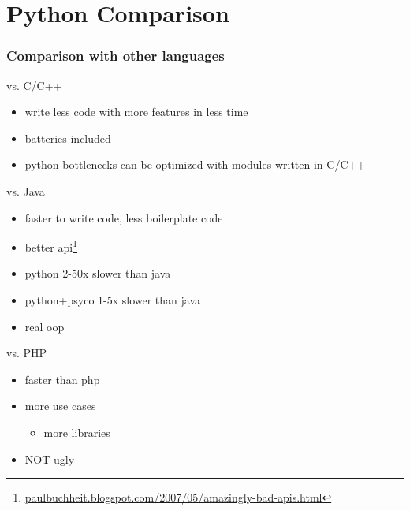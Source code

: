 \documentclass{beamer}
\begin{document}
\section{Python Comparison}	%
\begin{frame}
    \frametitle{Comparison with other languages}
    \begin{block}{vs. C/C++}
    \begin{itemize}
        \item write less code with more features in less time
        \item batteries included
        \item python bottlenecks can be optimized with modules written in C/C++
    \end{itemize}
    \end{block}

    \begin{block}{vs. Java}
    \begin{itemize}
        \item faster to write code, less boilerplate code
        \item better api\footnote{\scriptsize \url{paulbuchheit.blogspot.com/2007/05/amazingly-bad-apis.html}}
        \item python 2-50x slower than java
        \item python+psyco 1-5x slower than java
        \item real oop
    \end{itemize}
    \end{block}
    
    \begin{block}{vs. PHP}
    \begin{itemize}
        \item faster than php
        \item more use cases
        \begin{itemize}
        	\item more libraries
        \end{itemize}
        \item NOT ugly
    \end{itemize}
    \end{block}


\end{frame}
\end{document}
